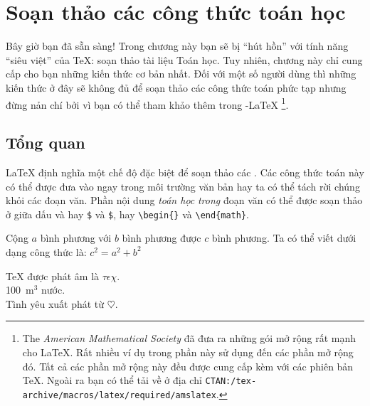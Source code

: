 \chapter{Soạn thảo các công thức toán học}
\begin{intro}
Bây giờ bạn đã sẵn sàng! Trong chương này bạn sẽ bị ``hút hồn'' với tính năng ``siêu việt'' của \TeX{}: soạn thảo tài liệu Toán học. Tuy nhiên, chương này chỉ cung cấp cho bạn những kiến thức cơ bản nhất. Đối với một số người dùng thì những kiến thức ở đây sẽ không đủ để soạn thảo các công thức toán phức tạp nhưng đừng nản chí bởi vì bạn có thể tham khảo thêm trong \AmS-\LaTeX{}%
  \footnote{The \emph{American Mathematical Society} đã đưa ra những gói mở rộng rất mạnh cho \LaTeX{}. Rất nhiều ví dụ trong phần này sử dụng đến các phần mở rộng đó. Tất cả các phần mở rộng này đều được cung cấp kèm với các phiên bản \TeX{}. Ngoài ra bạn có thể tải về ở địa chỉ \texttt{CTAN:/tex-archive/macros/latex/required/amslatex}.}.
\end{intro}

\section{Tổng quan}
\LaTeX{} định nghĩa một chế độ đặc biệt để soạn thảo các . Các công thức toán này có thể được đưa vào ngay trong môi trường văn bản hay ta có thể tách rời chúng khỏi các đoạn văn. Phần nội dung \emph{toán học}  \emph{trong} đoạn văn có thể được soạn thảo ở giữa dấu \ci{(} và \ci{)} hay \texttt{\$} và \texttt{\$}, hay \verb|\begin{|\verb|}| và \verb|\end{math}|.
\begin{example}
Cộng $a$ bình phương
với $b$ bình phương
được $c$ bình phương. Ta
có thể viết dưới dạng
công thức là: $c^{2} = a^{2}+b^{2}$
\end{example}

\begin{example}
\TeX{} được phát âm là
\(\tau\epsilon\chi\).\\[6pt]
100~m$^{3}$ nước.\\[6pt]
Tình yêu xuất phát từ
\begin{math}
\heartsuit
\end{math}.
\end{example}

